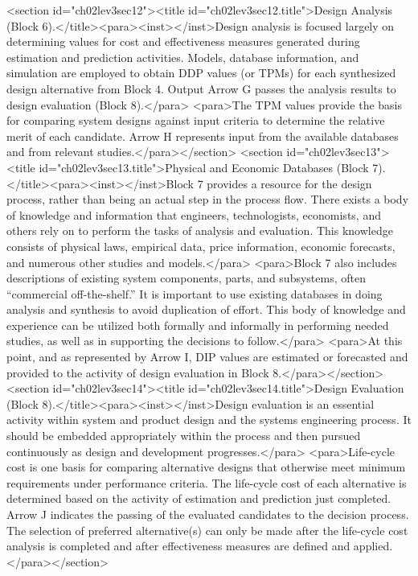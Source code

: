 <section id="ch02lev3sec12"><title id="ch02lev3sec12.title">Design Analysis (Block 6).</title><para><inst></inst>Design analysis is focused largely on determining values for cost and effectiveness measures generated during estimation and prediction activities. Models, database information, and simulation are employed to obtain DDP values (or TPMs) for each synthesized design alternative from Block 4. Output Arrow G passes the analysis results to design evaluation (Block 8).</para>
<para>The TPM values provide the basis for comparing system designs against input criteria to determine the relative merit of each candidate. Arrow H represents input from the available databases and from relevant studies.</para></section>
<section id="ch02lev3sec13"><title id="ch02lev3sec13.title">Physical and Economic Databases (Block 7).</title><para><inst></inst>Block 7 provides a resource for the design process, rather than being an actual step in the process flow. There exists a body of knowledge and information that engineers, technologists, economists, and others rely on to perform the tasks of analysis and evaluation. This knowledge consists of physical laws, empirical data, price information, economic forecasts, and numerous other studies and models.</para>
<para>Block 7 also includes descriptions of existing system components, parts, and subsystems, often “commercial off-the-shelf.” It is important to use existing databases in doing analysis and synthesis to avoid duplication of effort. This body of knowledge and experience can be utilized both formally and informally in performing needed studies, as well as in supporting the decisions to follow.</para>
<para>At this point, and as represented by Arrow I, DIP values are estimated or forecasted and provided to the activity of design evaluation in Block 8.</para></section>
<section id="ch02lev3sec14"><title id="ch02lev3sec14.title">Design Evaluation (Block 8).</title><para><inst></inst>Design evaluation is an essential activity within system and product design and the systems engineering process. It should be embedded appropriately within the process and then pursued continuously as design and development progresses.</para>
<para>Life-cycle cost is one basis for comparing alternative designs that otherwise meet minimum requirements under performance criteria. The life-cycle cost of each alternative is determined based on the activity of estimation and prediction just completed. Arrow J indicates the passing of the evaluated candidates to the decision process. The selection of preferred alternative(s) can only be made after the life-cycle cost analysis is completed and after effectiveness measures are defined and applied.</para></section>
